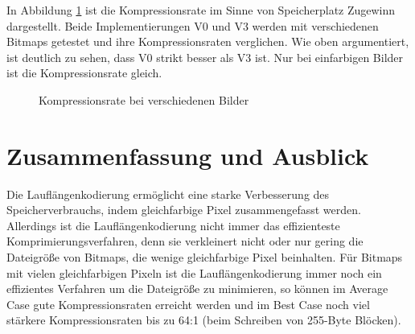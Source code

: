 \documentclass[course=erap]{aspdoc}
\begin{document}
In Abbildung \ref{fig:Kompressionsrate} ist die Kompressionsrate im Sinne von Speicherplatz Zugewinn dargestellt. Beide Implementierungen V0 und V3 werden mit verschiedenen Bitmaps getestet und ihre Kompressionsraten verglichen. Wie oben argumentiert, ist deutlich zu sehen, dass V0 strikt besser als V3 ist. Nur bei einfarbigen Bilder ist die Kompressionsrate gleich.
\clearpage
\begin{figure}[h]
\caption{Kompressionsrate bei verschiedenen Bilder}
\label{fig:Kompressionsrate}
\end{figure}
\section{Zusammenfassung und Ausblick}
Die Lauflängenkodierung ermöglicht eine starke Verbesserung des Speicherverbrauchs, indem gleichfarbige Pixel zusammengefasst werden. Allerdings ist die Lauflängenkodierung nicht immer das effizienteste Komprimierungsverfahren, denn sie verkleinert nicht oder nur gering die Dateigröße von Bitmaps, die wenige gleichfarbige Pixel beinhalten. Für Bitmaps mit vielen gleichfarbigen Pixeln ist die Lauflängenkodierung immer noch ein effizientes Verfahren um die Dateigröße zu minimieren, so können im Average Case gute Kompressionsraten erreicht werden und im Best Case noch viel stärkere Kompressionsraten bis zu 64:1 (beim Schreiben von 255-Byte Blöcken).
\clearpage



{}
\end{document}
